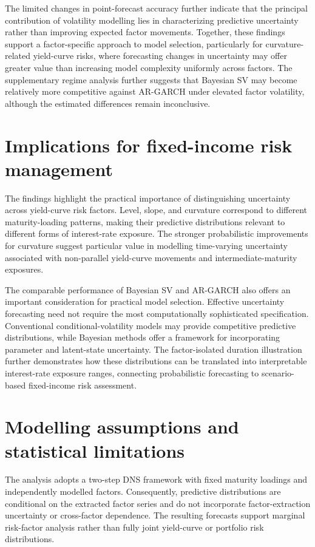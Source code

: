 \documentclass[
  12pt,
  letterpaper,
  DIV=11,
  numbers=noendperiod]{scrreprt}
\begin{document}
The limited changes in point-forecast accuracy further indicate that the
principal contribution of volatility modelling lies in characterizing
predictive uncertainty rather than improving expected factor movements.
Together, these findings support a factor-specific approach to model
selection, particularly for curvature-related yield-curve risks, where
forecasting changes in uncertainty may offer greater value than
increasing model complexity uniformly across factors. The supplementary
regime analysis further suggests that Bayesian SV may become relatively
more competitive against AR-GARCH under elevated factor volatility,
although the estimated differences remain inconclusive.

\section{Implications for fixed-income risk
management}\label{implications-for-fixed-income-risk-management}

The findings highlight the practical importance of distinguishing
uncertainty across yield-curve risk factors. Level, slope, and curvature
correspond to different maturity-loading patterns, making their
predictive distributions relevant to different forms of interest-rate
exposure. The stronger probabilistic improvements for curvature suggest
particular value in modelling time-varying uncertainty associated with
non-parallel yield-curve movements and intermediate-maturity exposures.

The comparable performance of Bayesian SV and AR-GARCH also offers an
important consideration for practical model selection. Effective
uncertainty forecasting need not require the most computationally
sophisticated specification. Conventional conditional-volatility models
may provide competitive predictive distributions, while Bayesian methods
offer a framework for incorporating parameter and latent-state
uncertainty. The factor-isolated duration illustration further
demonstrates how these distributions can be translated into
interpretable interest-rate exposure ranges, connecting probabilistic
forecasting to scenario-based fixed-income risk assessment.

\section{Modelling assumptions and statistical
limitations}\label{modelling-assumptions-and-statistical-limitations}

The analysis adopts a two-step DNS framework with fixed maturity
loadings and independently modelled factors. Consequently, predictive
distributions are conditional on the extracted factor series and do not
incorporate factor-extraction uncertainty or cross-factor dependence.
The resulting forecasts support marginal risk-factor analysis rather
than fully joint yield-curve or portfolio risk distributions.
\end{document}
